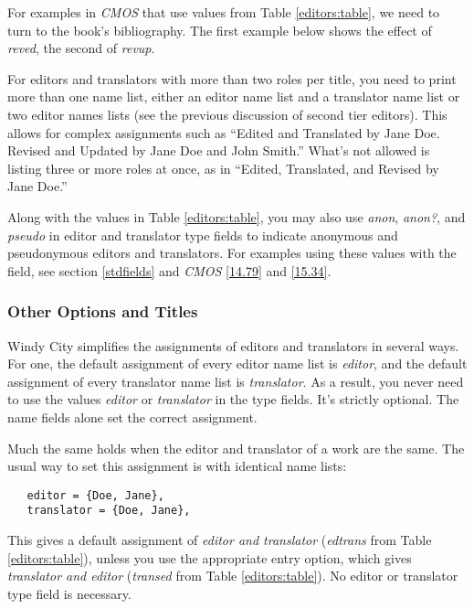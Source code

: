 \documentclass[11pt,letterpaper,oneside]{article}
\begin{document}
For examples in \textit{CMOS} that use values from Table
\ref{editors:table}, we need to turn to the book's bibliography. The
first example below shows the effect of \textit{reved}, the second of
\textit{revup}.

\begin{citebib}
\item \cite{fowler1965}
\item \cite{gowers2015}
\end{citebib}

For editors and translators with more than two roles per title, you
need to print more than one name list, either an editor name list and
a translator name list or two editor names lists (see the previous
discussion of second tier editors). This allows for complex
assignments such as ``Edited and Translated by Jane Doe. Revised and
Updated by Jane Doe and John Smith.'' What's not allowed is listing
three or more roles at once, as in ``Edited, Translated, and Revised
by Jane Doe.''

Along with the values in Table \ref{editors:table}, you may also use
\textit{anon}, \textit{anon?}, and \textit{pseudo} in editor and
translator type fields to indicate anonymous and pseudonymous editors
and translators. For examples using these values with the
 field, see section \ref{stdfields} and
\textit{CMOS} \ref{14.79} and \ref{15.34}.

\subsubsection{Other Options and Titles}
\label{editors:other}

Windy City simplifies the assignments of editors and translators in
several ways. For one, the default assignment of every editor name
list is \textit{editor}, and the default assignment of every
translator name list is \textit{translator}. As a result, you never
need to use the values \textit{editor} or \textit{translator} in the
type fields. It's strictly optional. The name fields alone set the
correct assignment.

Much the same holds when the editor and translator of a work are the
same. The usual way to set this assignment is with identical name
lists:

\begin{verbatim}
   editor = {Doe, Jane},
   translator = {Doe, Jane},
\end{verbatim}

\noindent This gives a default assignment of \textit{editor and
translator} (\textit{edtrans} from Table \ref{editors:table}), unless you
use the appropriate  entry option, which gives
\textit{translator and editor} (\textit{transed} from Table
\ref{editors:table}). No editor or translator type field is necessary.
\end{document}
